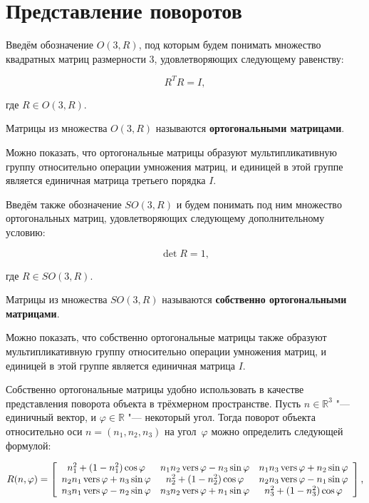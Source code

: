 \section{Представление поворотов}

Введём обозначение $O(3,R)$, под которым будем понимать множество квадратных матриц размерности 3, удовлетворяющих
следующему равенству:

$$R^T R=I,$$

\noindent где $R \in O(3,R)$.

\begin{definition}
Матрицы из множества $O(3,R)$ называются \textbf{ортогональными матрицами}.
\end{definition}

Можно показать, что ортогональные матрицы образуют мультипликативную группу относительно операции умножения матриц, и
единицей в этой группе является единичная матрица третьего порядка $I$.

Введём также обозначение $SO(3,R)$ и будем понимать под ним множество ортогональных матриц, удовлетворяющих
следующему дополнительному условию:

$$\det R = 1,$$

\noindent где $R \in SO(3, R)$.

\begin{definition}
Матрицы из множества $SO(3,R)$ называются \textbf{собственно ортогональными матрицами}.
\end{definition}

Можно показать, что собственно ортогональные матрицы также образуют мультипликативную группу относительно операции
умножения матриц, и единицей в этой группе является единичная матрица $I$.

Собственно ортогональные матрицы удобно использовать в качестве представления поворота объекта в трёхмерном
пространстве. Пусть $n \in \mathbb{R}^3$ "--- единичный вектор, и $\varphi \in \mathbb{R}$ "--- некоторый угол. Тогда
поворот объекта относительно оси $n=(n_1,n_2,n_3)$ на угол~$\varphi$ можно определить следующей формулой:

\begin{equation}
R(n,\varphi)=
\left[ {\begin{array}{ccc}
    n_1^2+(1-n_1^2)\cos\varphi     & n_1n_2\operatorname{vers}\varphi-n_3\sin\varphi & n_1n_3\operatorname{vers}\varphi+n_2\sin\varphi \\
    n_2n_1\operatorname{vers}\varphi+n_3\sin\varphi & n_2^2+(1-n_2^2)\cos\varphi     & n_2n_3\operatorname{vers}\varphi-n_1\sin\varphi \\
    n_3n_1\operatorname{vers}\varphi-n_2\sin\varphi & n_3n_2\operatorname{vers}\varphi+n_1\sin\varphi & n_3^2+(1-n_3^2)\cos\varphi     \\
\end{array} } \right],
\label{rotation-matrix}
\end{equation}

